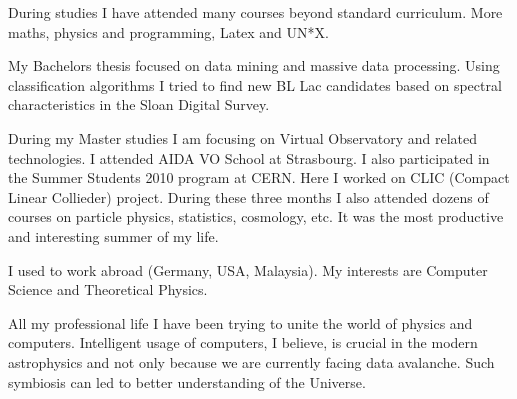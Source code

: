 During studies I have attended many courses beyond standard
curriculum. More maths, physics and programming, Latex and UN*X.

My Bachelors thesis focused on data mining and massive data
processing. Using classification algorithms I tried to find new BL Lac
candidates based on spectral characteristics in the Sloan Digital Survey.

During my Master studies I am focusing on Virtual Observatory and
related technologies. I attended AIDA VO School at Strasbourg. I also
participated in the Summer Students 2010 program at CERN. Here I
worked on CLIC (Compact Linear Collieder) project. During these three
months I also attended dozens of courses on particle physics,
statistics, cosmology, etc. It was the most productive and interesting
summer of my life.

I used to work abroad (Germany, USA, Malaysia). My interests are
Computer Science and Theoretical Physics.

All my professional life I have been trying to unite the world of
physics and computers. Intelligent usage of computers, I believe, is
crucial in the modern astrophysics and not only because we are
currently facing data avalanche. Such symbiosis can led to better
understanding of the Universe.



 


